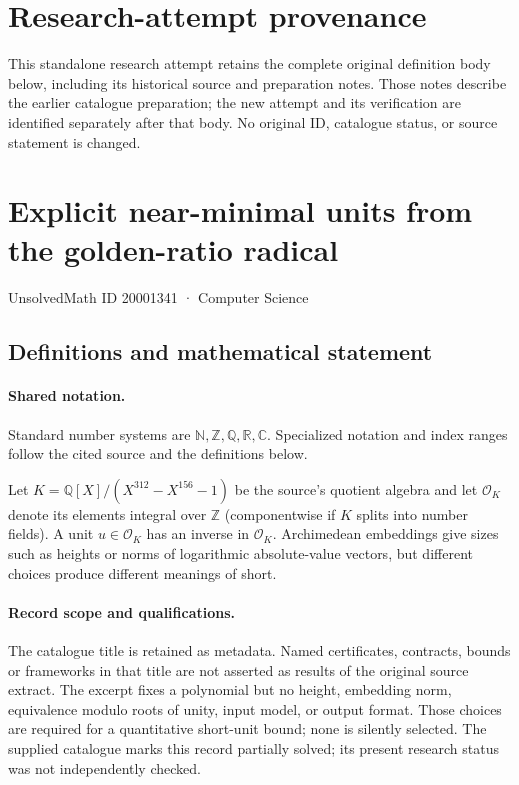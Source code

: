 \documentclass[11pt]{article}
\begin{document}
\section*{Research-attempt provenance}
This standalone research attempt retains the complete original definition body below,
including its historical source and preparation notes. Those notes describe the
earlier catalogue preparation; the new attempt and its verification are identified
separately after that body. No original ID, catalogue status, or source statement is changed.

\section{Explicit near-minimal units from the golden-ratio radical}\label{20001341}
{\small UnsolvedMath ID 20001341 · Computer Science}
\subsection{Definitions and mathematical statement}

\paragraph{Shared notation.}Standard number systems are $\mathbb N,\mathbb Z,\mathbb Q,\mathbb R,\mathbb C$. Specialized notation and index ranges follow the cited source and the definitions below.


Let $K=\mathbb Q[X]/(X^{312}-X^{156}-1)$ be the source's quotient algebra and let $\mathcal O_K$ denote its elements integral over $\mathbb Z$ (componentwise if $K$ splits into number fields). A unit $u\in\mathcal O_K$ has an inverse in $\mathcal O_K$. Archimedean embeddings give sizes such as heights or norms of logarithmic absolute-value vectors, but different choices produce different meanings of short.
\paragraph{Record scope and qualifications.}
The catalogue title is retained as metadata. Named certificates, contracts, bounds or frameworks in that title are not asserted as results of the original source extract.
The excerpt fixes a polynomial but no height, embedding norm, equivalence modulo roots of unity, input model, or output format. Those choices are required for a quantitative short-unit bound; none is silently selected. The supplied catalogue marks this record partially solved; its present research status was not independently checked.
\end{document}

